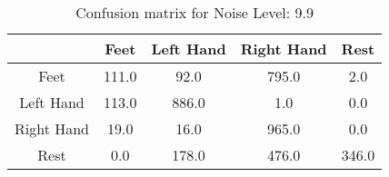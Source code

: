 \begin{table}[!htbp]
    \centering
    \begin{tabular}{|c||c|c|c|c|}
        \hline
		 & Feet & Left Hand & Right Hand & Rest \\
        \hline
        \hline
        Feet & 111.0 & 92.0 & 795.0 & 2.0 \\
        \hline
        Left Hand & 113.0 & 886.0 & 1.0 & 0.0 \\
        \hline
        Right Hand & 19.0 & 16.0 & 965.0 & 0.0 \\
        \hline
        Rest & 0.0 & 178.0 & 476.0 & 346.0 \\
        \hline
    \end{tabular}
    \caption{Confusion matrix for Noise Level: 9.9}
\end{table}